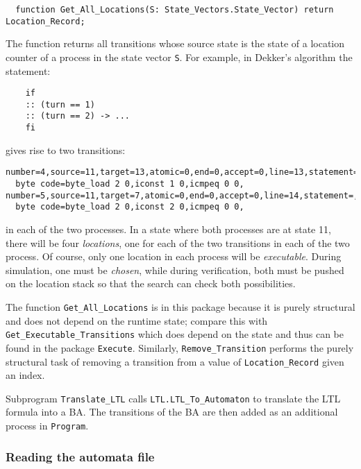 \documentclass[11pt]{article}
\newcommand*{\p}[1]{\texttt{#1}}
\begin{document}
\begin{footnotesize}
\begin{verbatim}
  function Get_All_Locations(S: State_Vectors.State_Vector) return Location_Record;
\end{verbatim}
\end{footnotesize}

The function returns all transitions whose source state is the state
of a location counter of a process in the state vector \p{S}. For example,
in Dekker's algorithm the statement:

\begin{footnotesize}
\begin{verbatim}
    if
    :: (turn == 1)
    :: (turn == 2) -> ...
    fi
\end{verbatim}
\end{footnotesize}

gives rise to two transitions:

\begin{footnotesize}
\begin{verbatim}
number=4,source=11,target=13,atomic=0,end=0,accept=0,line=13,statement=,
  byte code=byte_load 2 0,iconst 1 0,icmpeq 0 0,
number=5,source=11,target=7,atomic=0,end=0,accept=0,line=14,statement=,
  byte code=byte_load 2 0,iconst 2 0,icmpeq 0 0,
\end{verbatim}
\end{footnotesize}
in each of the two processes. In a state where both processes are at
state 11, there will be four \emph{locations}, one for each of the two
transitions in each of the two process. Of course, only one location in each
process will be \emph{executable}. During simulation, one must be
\emph{chosen}, while during verification, both must be pushed on the
location stack so that the search can check both possibilities.

The function \p{Get\_All\_Locations} is in this package because it is
purely structural and does not depend on the runtime state; compare this
with \p{Get\_Executable\_Transitions} which does depend on the state and
thus can be found in the package \p{Execute}. Similarly,
\p{Remove\_Transition} performs the purely structural task of removing a
transition from a value of \p{Location\_Record} given an index.

Subprogram \p{Translate\_LTL} calls \p{LTL.LTL\_To\_Automaton} to
translate the LTL formula into a BA. The transitions of the BA are then
added as an additional process in \p{Program}.

\subsubsection*{Reading the automata file}
\end{document}
